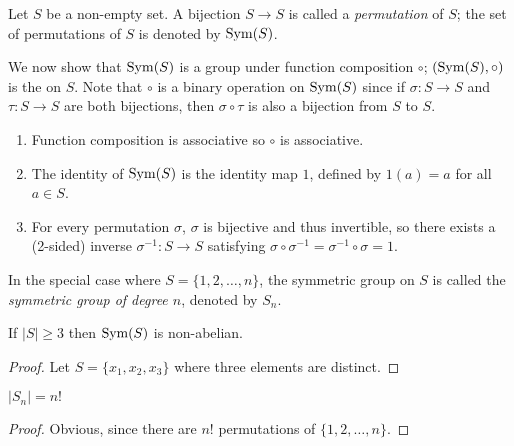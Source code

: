 \begin{example}
Let $S$ be a non-empty set. A bijection $S\to S$ is called a \emph{permutation} of $S$; the set of permutations of $S$ is denoted by $\operatorname{Sym}(S)$.

We now show that $\operatorname{Sym}(S)$ is a group under function composition $\circ$; $(\operatorname{Sym}(S),\circ)$ is the  on $S$. Note that $\circ$ is a binary operation on $\operatorname{Sym}(S)$ since if $\sigma:S\to S$ and $\tau:S\to S$ are both bijections, then $\sigma\circ\tau$ is also a bijection from $S$ to $S$.
\begin{enumerate}[label=(\roman*)]
\item Function composition is associative so $\circ$ is associative.
\item The identity of $\operatorname{Sym}(S)$ is the identity map $1$, defined by $1(a)=a$ for all $a\in S$.
\item For every permutation $\sigma$, $\sigma$ is bijective and thus invertible, so there exists a (2-sided) inverse $\sigma^{-1}:S\to S$ satisfying $\sigma\circ\sigma^{-1}=\sigma^{-1}\circ\sigma=1$.
\end{enumerate}

In the special case where $S=\{1,2,\dots,n\}$, the symmetric group on $S$ is called the \emph{symmetric group of degree $n$}, denoted by $S_n$.

\begin{proposition*}
If $|S|\ge3$ then $\operatorname{Sym}(S)$ is non-abelian.
\end{proposition*}

\begin{proof}
Let $S=\{x_1,x_2,x_3\}$ where three elements are distinct.
\end{proof}

\begin{proposition*}
$|S_n|=n!$
\end{proposition*}

\begin{proof}
Obvious, since there are $n!$ permutations of $\{1,2,\dots,n\}$.
\end{proof}
\end{example}

